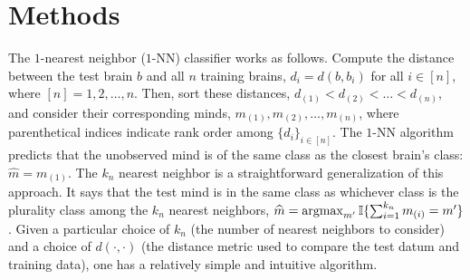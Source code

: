 \documentclass{article}
\newcommand{\II}{\mathbb{I}}           %
\providecommand{\mc}[1]{\mathcal{#1}}
\providecommand{\mh}[1]{\widehat{#1}}
\newcommand{\argmax}{\operatornamewithlimits{argmax}}
\begin{document}


\section*{Methods}
\label{sec:methods}




The $1$-nearest neighbor ($1$-NN) classifier works as follows.  Compute the distance between the test brain  $b$ and all $n$ training brains, $d_i=d(b,b_i)$ for all $i \in [n]$, where $[n]=1,2,\ldots, n$.  Then, sort these distances, $d_{(1)} < d_{(2)} < \ldots < d_{(n)}$, and consider their corresponding minds, $m_{(1)}, m_{(2)}, \ldots, m_{(n)}$, where parenthetical indices indicate rank order among $\{d_i\}_{i\in[n]}$.  %
The $1$-NN algorithm predicts that the unobserved mind is of the same class as the closest brain's class: $\mh{m}=m_{(1)}$.  The $k_n$ nearest neighbor is a straightforward generalization of this approach.  It says that the test mind is in the same class as whichever class is the plurality class among the $k_n$ nearest neighbors, $\mh{m}=\argmax_{m'}\II\{\sum_{i=1}^{k_n} m_{(i)}=m'\}$.  Given a particular choice of $k_n$ (the number of nearest neighbors to consider) and a choice of $d(\cdot,\cdot)$ (the distance metric used to compare the test datum and training data), one has a relatively simple and intuitive algorithm.  
\end{document}
